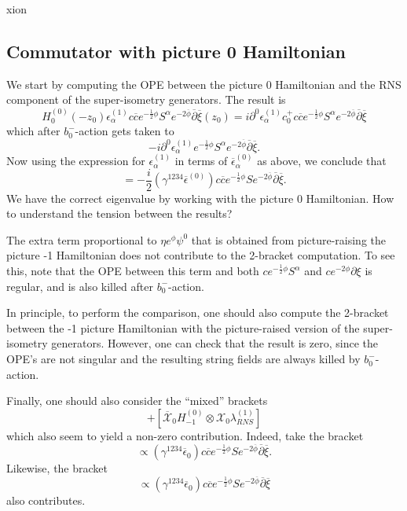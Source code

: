 xion\documentclass[12pt]{article}
\def\be{\begin{equation}}
\def\ee{\end{equation}}
\numberwithin{equation}{section}
\newcommand{\B}[1]{\overline{#1}}
\begin{document}
\subsection{Commutator with picture 0 Hamiltonian}
We start by computing the OPE between the picture 0 Hamiltonian and the RNS component of the super-isometry generators. The result is
\be
	H^{(0)}_{0}(-z_{0})\epsilon^{(1)}_{\alpha}c\B{c}e^{-\frac{1}{2}\phi}S^{\alpha}e^{-2\B{\phi}}\B{\partial}\B{\xi}(z_{0})=i\partial^{0}\epsilon^{(1)}_{\alpha}c_{0}^{+}c\B{c}e^{-\frac{1}{2}\phi}S^{\alpha}e^{-2\B{\phi}}\B{\partial}\B{\xi}
\ee
which after $b_{0}^{-}$-action gets taken to
\be
	-i\partial^{0}\epsilon^{(1)}_{\alpha}e^{-\frac{1}{2}\phi}S^{\alpha}e^{-2\B{\phi}}\B{\partial}\B{\xi}.
\ee
Now using the expression for $\epsilon^{(1)}_{\alpha}$ in terms of $\B{\epsilon}^{(0)}_{\alpha}$ as above, we conclude that
\be
	[H^{(0)}_{0}\otimes\epsilon^{(1)}_{\alpha}c\B{c}e^{-\frac{1}{2}\phi}S^{\alpha}e^{-2\B{\phi}}\B{\partial}\B{\xi}]=-\frac{i}{2}(\gamma^{1234}\B{\epsilon}^{(0)})c\B{c}e^{-\frac{1}{2}\phi}Se^{-2\B{\phi}}\B{\partial}\B{\xi}.
\ee
We have the correct eigenvalue by working with the picture 0 Hamiltonian. How to understand the tension between the results?

The extra term proportional to $\eta e^{\phi}\psi^{0}$ that is obtained from picture-raising the picture -1 Hamiltonian does not contribute to the 2-bracket computation. To see this, note that the OPE between this term and both $c e^{-\frac{1}{2}\phi}S^{\alpha}$ and $ce^{-2\phi}\partial\xi$ is regular, and is also killed after $b_{0}^{-}$-action.

In principle, to perform the comparison, one should also compute the 2-bracket between the -1 picture Hamiltonian with the picture-raised version of the super-isometry generators. However, one can check that the result is zero, since the OPE's are not singular and the resulting string fields are always killed by $b_{0}^{-}$-action.

Finally, one should also consider the ``mixed'' brackets
\be
	[\mathcal{X}_{0}H^{(0)}_{-1}\otimes\B{\mathcal{X}}_{0}\lambda^{(1)}_{RNS}]+[\B{\mathcal{X}}_{0}H^{(0)}_{-1}\otimes{\mathcal{X}}_{0}\lambda^{(1)}_{RNS}]
\ee
which also seem to yield a non-zero contribution. Indeed, take the bracket
\be
	[c\partial X^{0}\B{c}e^{-2\B{\phi}}\B{\partial}\B{\xi}\otimes \epsilon_{\alpha}^{(1)}ce^{-\frac{1}{2}\phi}S^{\alpha}]\propto (\gamma^{1234}\B{\epsilon}_{0})c\B{c}e^{-\frac{1}{2}\phi}Se^{-2\B{\phi}}\B{\partial}\B{\xi}.
\ee
Likewise, the bracket
\be
	[ce^{-2\phi}\partial\xi\B{c}\B{\partial}X^{0}\otimes\epsilon^{(1)}_{\alpha}(\partial\eta+\eta bc+\eta\partial\phi)e^{\frac{3}{2}\phi}S^{\alpha}e^{-2\B{\phi}}\B{\partial}\B{\xi}]\propto (\gamma^{1234}\B{\epsilon}_{0})c\B{c}e^{-\frac{1}{2}\phi}Se^{-2\B{\phi}}\B{\partial}\B{\xi}
\ee
also contributes.
\end{document}
